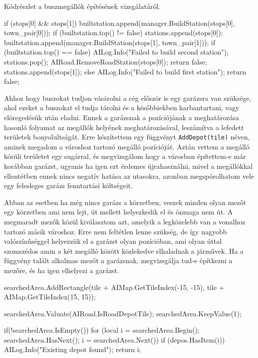 Kódrészlet a buszmegállók építésének vizsgálatáról.
\begin{cpp}
if (stops[0] && stops[1]) {
  builtstation.append(manager.BuildStation(stops[0], town_pair[0]));
  if (builtstation.top() != false) {
    stations.append(stops[0]);
    builtstation.append(manager.BuildStation(stops[1], town_pair[1]));
    if (builtstation.top() == false) {
      AILog.Info("Failed to build second station");
      stations.pop();
      AIRoad.RemoveRoadStation(stops[0]);
      return false;
    }
    stations.append(stops[1]);
  } else {
    AILog.Info("Failed to build first station");
    return false;
  }
} 
\end{cpp}

Ahhoz hogy buszokat tudjon vásárolni a cég először is egy garázsra van szüksége, ahol ezeket a buszokat el tudja tárolni és a későbbiekben karbantartani, vagy elöregedésük után eladni. Ennek a garázsnak a pozíciójának a meghatározása hasonló folyamat az megállók helyének meghatározásával, leszámítva a lefedett területek bonyolultságát. Erre készítettem egy függvényt \texttt{AddDepot(tile)} néven, aminek megadom a városhoz tartozó megálló pozícióját. Aztán vettem a megálló körüli területet egy sugárral, és megvizsgálom hogy a városban építettem-e már korábban garázst, ugyanis ha igen ezt érdemes újrahasználni, mivel a megállókkal ellentétben ennek nincs negatív hatása az utasokra, azonban megspórolhatom vele egy felesleges garázs fenntartási költségeit.

Abban az esetben ha még nincs garázs a körzetben, veszek minden olyan mezőt egy körzetben ami nem lejt, út mellett helyezkedik el és önmaga nem út. A megmaradt mezők közül kiválasztom azt, amelyik a legközelebb van a vonalhoz tartozó másik városhoz. Erre nem feltétlen lenne szükség, de így nagyobb valószínűséggel helyezzük el a garázst olyan pozícióban, ami olyan úttal szomszédos amin a két megálló között közlekedve elhaladnak a járművek. Ha a függvény talált alkalmas mezőt a garázsnak, megvizsgálja tud-e építkezni a mezőre, és ha igen elhelyezi a garázst.

\begin{cpp}
searchedArea.AddRectangle(tile + AIMap.GetTileIndex(-15, -15),
 tile + AIMap.GetTileIndex(15, 15));

searchedArea.Valuate(AIRoad.IsRoadDepotTile);
searchedArea.KeepValue(1);

if(!searchedArea.IsEmpty()) {
  for (local i = searchedArea.Begin(); 
   searchedArea.HasNext(); i = searchedArea.Next()) {
    if (depos.HasItem(i)) {
      AILog.Info("Existing depot found");
      return i;
    }
  }
}
\end{cpp}

